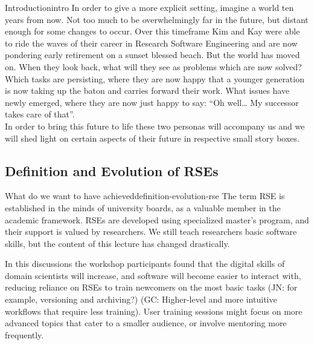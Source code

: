 \documentclass{eceasst}
\begin{document}
\begin{story}{Introduction}{intro}
In order to give a more explicit setting, imagine a world ten years from now.
Not too much to be overwhelmingly far in the future, but distant enough for some changes to occur.
Over this timeframe Kim\cite{Anzt2021} and Kay\cite{Goth2024}
were able to ride the waves of their career in Research Software Engineering and are now pondering early retirement on a sunset blessed beach.
But the world has moved on.
When they look back, what will they see as problems which are now solved?
Which tasks are persisting, where they are now happy that a younger generation is now taking up the baton and carries forward their work.
What issues have newly emerged, where they are now just happy to say: “Oh well… My successor takes care of that”.\\
In order to bring this future to life these two personas will accompany us and we will shed light on certain aspects
of their future in respective small story boxes.
 \end{story}


\subsection{Definition and Evolution of RSEs}
\begin{whatis}{What do we want to have achieved}{definition-evolution-rse}
The term RSE is established in the minds of university boards, as a valuable member in the academic framework.
RSEs are developed using specialized master's program, and their support is valued by researchers. We still teach researchers basic software skills, but the content of this lecture has changed drastically.
\end{whatis}
In this discussions the workshop participants found that
the digital skills of domain scientists will increase,
and software will become easier to interact with,
reducing reliance on RSEs to train newcomers on the most basic tasks
(JN: for example, versioning and archiving?)
(GC: Higher-level and more intuitive workflows that require less training).
User training sessions might focus on more advanced topics
that cater to a smaller audience, or involve mentoring more frequently.
\end{document}
